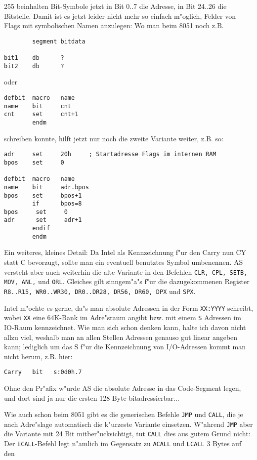 \documentclass[12pt,a4paper,twoside]{report}
\newcommand{\tty}[1]{{\tt #1}}
\begin{document}
255 beinhalten Bit-Symbole jetzt in Bit 0..7 die Adresse, in Bit 24..26
die Bitstelle.  Damit ist es jetzt leider nicht mehr so einfach m"oglich,
Felder von Flags mit symbolischen Namen anzulegen: Wo man beim 8051 noch
z.B.
\begin{verbatim}
        segment bitdata

bit1    db      ?
bit2    db      ?
\end{verbatim}
oder
\begin{verbatim}
defbit	macro   name
name    bit     cnt
cnt     set     cnt+1
        endm
\end{verbatim}
schreiben konnte, hilft jetzt nur noch die zweite Variante weiter, z.B.
so:
\begin{verbatim}
adr     set     20h     ; Startadresse Flags im internen RAM
bpos    set     0

defbit  macro   name
name    bit     adr.bpos
bpos    set     bpos+1
        if      bpos=8
bpos     set     0
adr      set     adr+1
        endif
        endm
\end{verbatim}
Ein weiteres, kleines Detail: Da Intel als Kennzeichnung f"ur den Carry
nun CY statt C bevorzugt, sollte man ein eventuell benutztes Symbol
umbenennen.  AS versteht aber auch weiterhin die alte Variante in den
Befehlen \tty{CLR, CPL, SETB, MOV, ANL,} und \tty{ORL}.  Gleiches gilt
sinngem"a"s f"ur die dazugekommenen Register \tty{R8..R15, WR0..WR30,
DR0..DR28, DR56, DR60, DPX} und \tty{SPX}.
\par
Intel m"ochte es gerne, da"s man absolute Adressen in der Form \tty{XX:YYYY}
schreibt, wobei \tty{XX} eine 64K-Bank im Adre"sraum angibt bzw. mit einem
\tty{S} Adressen im IO-Raum kennzeichnet.  Wie man sich schon denken kann,
halte ich davon nicht allzu viel, weshalb man an allen Stellen Adressen
genauso gut linear angeben kann; lediglich um das S f"ur die Kennzeichnung
von I/O-Adressen kommt man nicht herum, z.B. hier:
\begin{verbatim}
Carry   bit   s:0d0h.7
\end{verbatim}
Ohne den Pr"afix w"urde AS die absolute Adresse in das Code-Segment
legen, und dort sind ja nur die ersten 128 Byte bitadressierbar...
\par
Wie auch schon beim 8051 gibt es die generischen Befehle \tty{JMP} und
\tty{CALL}, die je nach Adre"slage automatisch die k"urzeste Variante
einsetzen.  W"ahrend \tty{JMP} aber die Variante mit 24 Bit mitber"ucksichtigt,
tut \tty{CALL} dies aus gutem Grund nicht: Der \tty{ECALL}-Befehl legt
n"amlich im Gegensatz zu \tty{ACALL} und \tty{LCALL} 3 Bytes auf den
\end{document}

